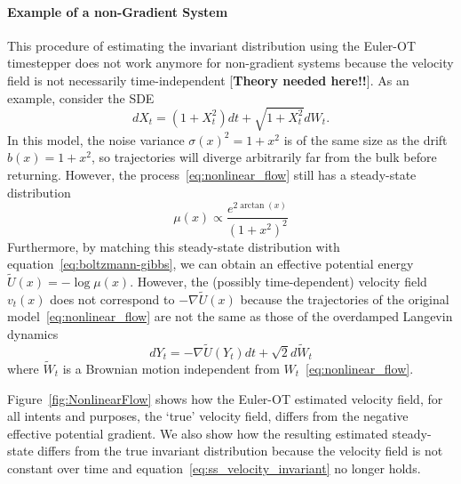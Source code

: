 \documentclass{article}
\begin{document}
\paragraph{Example of a non-Gradient System}
This procedure of estimating the invariant distribution using the Euler-OT timestepper does not work anymore for non-gradient systems because the velocity field is not necessarily time-independent [\textbf{Theory needed here!!}]. As an example, consider the SDE
\begin{equation} \label{eq:nonlinear_flow}
    dX_t = (1 + X_t^2)dt + \sqrt{1+X_t^2} dW_t.
\end{equation}
In this model, the noise variance $\sigma(x)^2 = 1+x^2$ is of the same size as the drift $b(x)=1+x^2$, so trajectories will diverge arbitrarily far from the bulk before returning. However, the process~\eqref{eq:nonlinear_flow} still has a steady-state distribution
\begin{equation}
    \mu(x) \propto \frac{e^{2 \arctan(x)}}{(1+x^2)^2}
\end{equation}
Furthermore, by matching this steady-state distribution with equation~\eqref{eq:boltzmann-gibbs}, we can obtain an effective potential energy $\tilde{U}(x) = -\log \mu(x)$. However, the (possibly time-dependent) velocity field $v_t(x)$ does not correspond to $-\nabla \tilde{U}(x)$ because the trajectories of the original model~\eqref{eq:nonlinear_flow} are not the same as those of the overdamped Langevin dynamics
\begin{equation*}
    dY_t = -\nabla \tilde{U}(Y_t)dt + \sqrt{2} d\tilde{W}_t
\end{equation*}
where $\tilde{W}_t$ is a Brownian motion independent from $W_t$~\eqref{eq:nonlinear_flow}.

Figure~\ref{fig:NonlinearFlow} shows how the Euler-OT estimated velocity field, for all intents and purposes, the `true' velocity field, differs from the negative effective potential gradient. We also show how the resulting estimated steady-state differs from the true invariant distribution because the velocity field is not constant over time and equation~\eqref{eq:ss_velocity_invariant} no longer holds.
\end{document}
